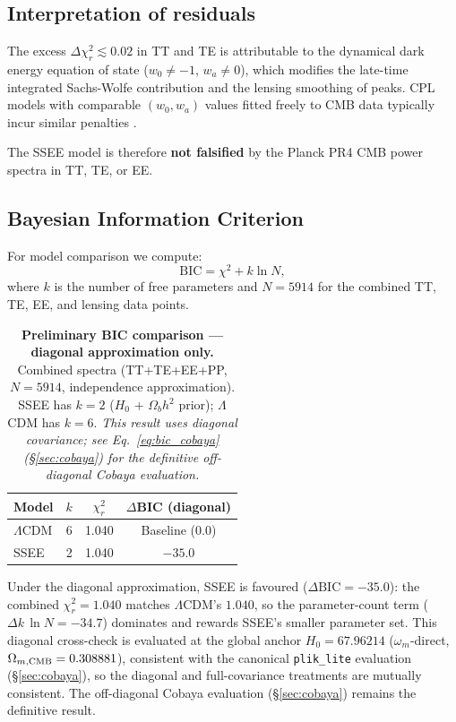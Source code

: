 \documentclass[12pt,a4paper]{article}
\begin{document}
\subsection{Interpretation of residuals}

The excess $\Delta\chi^2_r\lesssim0.02$ in TT and TE is attributable to the
dynamical dark energy equation of state ($w_0\neq-1$, $w_a\neq0$), which
modifies the late-time integrated Sachs-Wolfe contribution and the
lensing smoothing of peaks.
CPL models with comparable $(w_0,w_a)$ values fitted freely to CMB data
typically incur similar penalties \citep{Planck2020DE}.

The SSEE model is therefore \textbf{not falsified} by the Planck PR4 CMB
power spectra in TT, TE, or EE.

\subsection{Bayesian Information Criterion}
\label{sec:bic}

For model comparison we compute:
\begin{equation}
\mathrm{BIC} = \chi^2 + k\ln N,
\end{equation}
where $k$ is the number of free parameters and $N=5914$ for the combined TT, TE, EE, and lensing data points.

\begin{table}[ht]
\centering
\caption{\textbf{Preliminary BIC comparison — diagonal approximation only.}
Combined spectra (TT+TE+EE+PP, $N=5914$, independence approximation).
SSEE has $k=2$ ($H_0$ + $\Omega_b h^2$ prior); $\Lambda$CDM has $k=6$.
\textit{This result uses diagonal covariance; see Eq.~\eqref{eq:bic_cobaya}
(\S\ref{sec:cobaya}) for the definitive off-diagonal Cobaya evaluation.}}
\label{tab:bic}
\begin{tabular}{lccc}
\toprule
Model & $k$ & $\chi^2_r$ & $\Delta$BIC (diagonal) \\
\midrule
$\Lambda$CDM & 6 & 1.040 & Baseline ($0.0$) \\
SSEE & 2 & 1.040 & $-35.0$ \\
\bottomrule
\end{tabular}
\end{table}

Under the diagonal approximation, SSEE is favoured ($\Delta\mathrm{BIC}=-35.0$):
the combined $\chi^2_r=1.040$ matches $\Lambda$CDM's $1.040$, so the
parameter-count term ($\Delta k\,\ln N=-34.7$) dominates and rewards SSEE's
smaller parameter set. This diagonal cross-check is evaluated at the global
anchor $H_0=67.96214$ ($\omega_m$-direct, $\Omega_{m,\rm CMB}=0.308881$),
consistent with the canonical \texttt{plik\_lite} evaluation
(\S\ref{sec:cobaya}), so the diagonal and full-covariance treatments are
mutually consistent. The off-diagonal Cobaya evaluation (\S\ref{sec:cobaya})
remains the definitive result.
\end{document}
